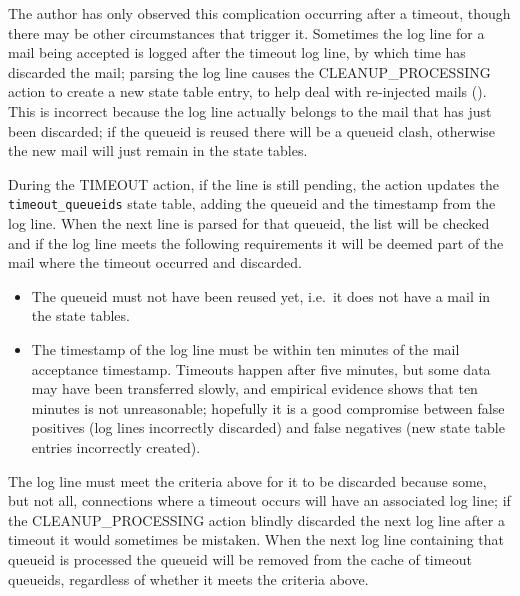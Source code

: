 \label{discarding cleanup log lines}

The author has only observed this complication occurring after a timeout,
though there may be other circumstances that trigger it.  Sometimes the
 log line for a mail being accepted is logged after the
timeout log line, by which time \parsername{} has discarded the mail;
parsing the  log line causes the CLEANUP\_PROCESSING action
to create a new state table entry, to help deal with re-injected mails
().  This is incorrect because the log line
actually belongs to the mail that has just been discarded; if the queueid
is reused there will be a queueid clash, otherwise the new mail will just
remain in the state tables.

During the TIMEOUT action, if the  line is still pending,
the action updates the \texttt{timeout\_queueids} state table, adding the
queueid and the timestamp from the log line.  When the next
 line is parsed for that queueid, the list will be checked
and if the log line meets the following requirements it will be deemed part
of the mail where the timeout occurred and discarded.

\begin{itemize}

    \item The queueid must not have been reused yet, i.e.\ it does not have
        a mail in the state tables.

    \item The timestamp of the  log line must be within ten
        minutes of the mail acceptance timestamp.  Timeouts happen after
        five minutes, but some data may have been transferred slowly, and
        empirical evidence shows that ten minutes is not unreasonable;
        hopefully it is a good compromise between false positives (log
        lines incorrectly discarded) and false negatives (new state table
        entries incorrectly created).

\end{itemize}

The  log line must meet the criteria above for it to be
discarded because some, but not all, connections where a timeout occurs
will have an associated  log line; if the
CLEANUP\_PROCESSING action blindly discarded the next  log
line after a timeout it would sometimes be mistaken.  When the next
 log line containing that queueid is processed the queueid
will be removed from the cache of timeout queueids, regardless of whether
it meets the criteria above.

